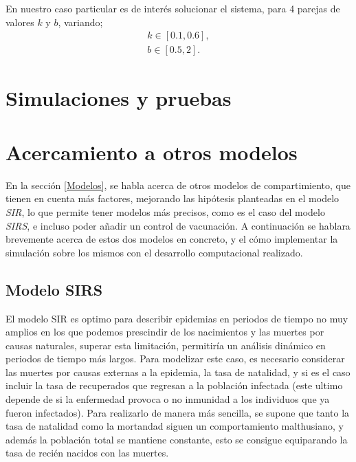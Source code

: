 \documentclass[journal]{IEEEtran}
\begin{document}
En nuestro caso particular es de interés solucionar el sistema, para 4 parejas de valores $k$ y $b$, variando;
\begin{equation}
	\begin{split}
		k \in [0.1, 0.6],\\
		b \in [0.5, 2].
	\end{split}
\end{equation}


\section{Simulaciones y pruebas}


\section{Acercamiento a otros modelos}
En la sección \ref{Modelos}, se habla acerca de otros modelos de compartimiento, que tienen en cuenta más factores,
mejorando las hipótesis planteadas en el modelo \textit{SIR}, lo que permite
tener modelos más precisos, como es el caso del modelo \textit{SIRS}, e incluso poder añadir
un control de vacunación. A continuación se hablara brevemente acerca de estos dos modelos en concreto,
y el cómo implementar la simulación sobre los mismos con el desarrollo computacional realizado.

\subsection{Modelo SIRS}\label{Modelo SIRS}
El modelo SIR es optimo para describir epidemias en periodos de tiempo no muy amplios
en los que podemos prescindir de los nacimientos y las muertes por causas naturales, superar esta limitación,
permitiría un análisis dinámico en periodos de tiempo más largos. 
Para modelizar este caso, es necesario considerar las muertes por causas externas a la epidemia,
la tasa de natalidad, y si es el caso incluir la tasa de recuperados que regresan a la población infectada (este ultimo depende 
de si la enfermedad provoca o no inmunidad a los individuos que ya fueron infectados). Para realizarlo de manera
más sencilla, se supone que tanto la tasa de natalidad como la mortandad 
siguen un comportamiento malthusiano, y además la población total se mantiene constante, esto se consigue equiparando la
tasa de recién nacidos con las muertes.\\ 
\end{document}

